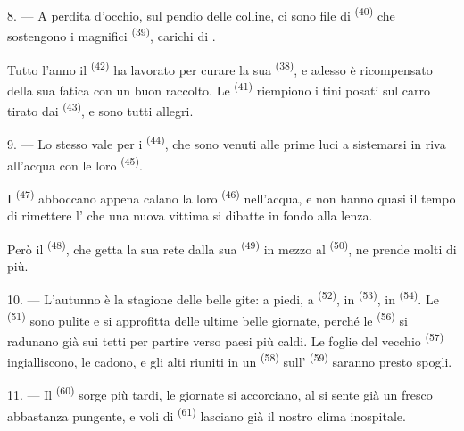 8. --- A perdita d'occhio, sul pendio delle colline, ci sono file di  \textsuperscript{(40)} che sostengono i magnifici 
\textsuperscript{(39)}, carichi di .

Tutto l'anno il  \textsuperscript{(42)} ha lavorato per curare la
sua  \textsuperscript{(38)}, e adesso è ricompensato della sua fatica con
un buon raccolto. Le  \textsuperscript{(41)} riempiono i tini
posati sul carro tirato dai  \textsuperscript{(43)}, e sono tutti allegri.

\VUsaut{5.0mm}
\VUsaut{3.4mm}

9. --- Lo stesso vale per i  \textsuperscript{(44)}, che
sono venuti alle prime luci a sistemarsi in riva all'acqua con le loro
 \textsuperscript{(45)}.

I  \textsuperscript{(47)} abboccano appena calano la loro 
\textsuperscript{(46)} nell'acqua, e non hanno quasi il tempo di rimettere l'
che una nuova vittima si dibatte in fondo alla lenza.

Però il  \textsuperscript{(48)}, che getta la sua rete
dalla sua  \textsuperscript{(49)} in mezzo al 
\textsuperscript{(50)}, ne prende molti di più.

10. --- L'autunno è la stagione delle belle gite: a piedi, a 
\textsuperscript{(52)}, in  \textsuperscript{(53)}, in
 \textsuperscript{(54)}. Le  \textsuperscript{(51)}
sono pulite e si approfitta delle ultime belle giornate, perché le 
\textsuperscript{(56)} si radunano già sui tetti per partire verso paesi più caldi. Le
foglie del vecchio  \textsuperscript{(57)} ingialliscono, le
 cadono, e gli alti  riuniti in un 
\textsuperscript{(58)} sull' \textsuperscript{(59)} saranno presto
spogli.

11. --- Il  \textsuperscript{(60)} sorge più tardi, le giornate si
accorciano, al  si sente già un fresco abbastanza pungente, e voli di
 \textsuperscript{(61)} lasciano già il nostro clima inospitale.
\VUsaut{6.0mm}
\VUfilet{22mm}
